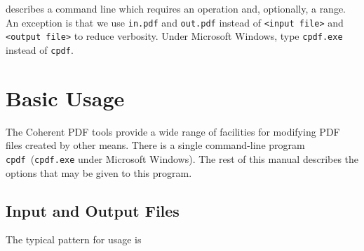 \documentclass{book}
\newcommand{\cpdf}{\texttt{cpdf}}
\begin{document}
\noindent{}

\noindent describes a command line which requires an operation and, optionally,
a range. An exception is that we use \texttt{in.pdf} and \texttt{out.pdf}
instead of \texttt{<input file>} and \texttt{<output file>} to reduce
verbosity. Under Microsoft Windows, type \texttt{cpdf.exe} instead of \texttt{cpdf}.



\cleardoublepage
\mainmatter
\pagestyle{fancy}
\chapter{Basic Usage}


\label{basicusage}

\noindent{}

  The Coherent PDF tools provide a wide range of facilities for modifying PDF
files created by other means. There is a single command-line program
\cpdf\ (\texttt{cpdf.exe} under Microsoft Windows). The rest of this manual describes the options that may be given
to this program.



   
  \section{Input and Output Files}
  The typical pattern for usage is
\end{document}
